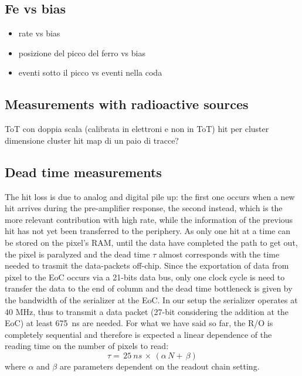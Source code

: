  
        
         \subsection{Fe vs bias}
         \begin{itemize}
             \item rate vs bias 
             \item posizione del picco del ferro vs bias    
             \item eventi sotto il picco vs eventi nella coda
         \end{itemize}
     
     
     \subsection{Measurements with radioactive sources}
         ToT con doppia scala (calibrata in elettroni e non in ToT)
         hit per cluster
         dimensione cluster
         hit map di un paio di tracce?
        \subsection{Dead time measurements}
        The hit loss is due to analog and digital pile up: the first one occurs when a new hit arrives during the pre-amplifier response, the second instead, which is the more relevant contribution with high rate, while the information of the previous hit has not yet been transferred to the periphery.  
        As only one hit at a time can be stored on the pixel's RAM, until the data have completed the path to get out, the pixel is paralyzed and the dead time $\tau$ almost corresponds with the time needed to trasmit the data-packets off-chip.
        Since the exportation of data from pixel to the EoC occurs via a 21-bits data bus, only one clock cycle is need to transfer the data to the end of column and the dead time bottleneck is given by the bandwidth of the serializer at the EoC. In our setup the serializer operates at 40 MHz, thus to transmit a data packet (27-bit considering the addition at the EoC) at least \SI{675}{ns} are needed. 
        For what we have said so far, the R/O is completely sequential and therefore is expected a linear dependence of the reading time on the number of pixels to read:
        \begin{equation}
            \tau =\, 25\: \unit{ns}\, \times\, (\alpha\, N +\, \beta)
            \label{eq:reading_time}
        \end{equation}
        where $\alpha$ and $\beta$ are parameters dependent on the readout chain setting. 
        
